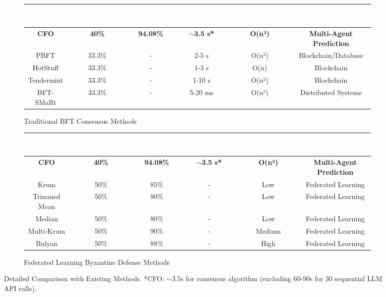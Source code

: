 \documentclass{article}
\begin{document}
\begin{figure}[H]
\centering
\begin{subfigure}{0.95\textwidth}
\centering
\begin{tabular}{|c|c|c|c|c|c|}
\hline
\rowcolor{cfoBlue}
\textcolor{white}{\textbf{Method}} & \textcolor{white}{\textbf{Byzantine Tolerance}} & \textcolor{white}{\textbf{Avg Accuracy}} & \textcolor{white}{\textbf{Consensus Delay}} & \textcolor{white}{\textbf{Communication}} & \textcolor{white}{\textbf{Application}} \\
\hline
\rowcolor{E8F4F8}
\textbf{CFO} & \textbf{40\%} & \textbf{94.08\%} & \textbf{$\sim$3.5 s*} & \textbf{O(n²)} & \textbf{Multi-Agent Prediction} \\
\hline
PBFT & 33.3\% & - & 2-5 s & O(n²) & Blockchain/Database \\
\hline
HotStuff & 33.3\% & - & 1-3 s & O(n) & Blockchain \\
\hline
Tendermint & 33.3\% & - & 1-10 s & O(n²) & Blockchain \\
\hline
BFT-SMaRt & 33.3\% & - & 5-20 ms & O(n³) & Distributed Systems \\
\hline
\end{tabular}
\caption{Traditional BFT Consensus Methods}
\end{subfigure}

\vspace{1cm}

\begin{subfigure}{0.95\textwidth}
\centering
\begin{tabular}{|c|c|c|c|c|c|}
\hline
\rowcolor{cfoBlue}
\textcolor{white}{\textbf{Method}} & \textcolor{white}{\textbf{Byzantine Tolerance}} & \textcolor{white}{\textbf{Avg Accuracy}} & \textcolor{white}{\textbf{Consensus Delay}} & \textcolor{white}{\textbf{Communication}} & \textcolor{white}{\textbf{Application}} \\
\hline
\rowcolor{E8F4F8}
\textbf{CFO} & \textbf{40\%} & \textbf{94.08\%} & \textbf{$\sim$3.5 s*} & \textbf{O(n²)} & \textbf{Multi-Agent Prediction} \\
\hline
Krum & 50\% & 85\% & - & Low & Federated Learning \\
\hline
Trimmed Mean & 50\% & 80\% & - & Low & Federated Learning \\
\hline
Median & 50\% & 80\% & - & Low & Federated Learning \\
\hline
Multi-Krum & 50\% & 90\% & - & Medium & Federated Learning \\
\hline
Bulyan & 50\% & 88\% & - & High & Federated Learning \\
\hline
\end{tabular}
\caption{Federated Learning Byzantine Defense Methods}
\end{subfigure}
\caption{Detailed Comparison with Existing Methods. *CFO: $\sim$3.5s for consensus algorithm (excluding 60-90s for 30 sequential LLM API calls).}
\label{fig:comparison_tables}
\end{figure}
\end{document}
